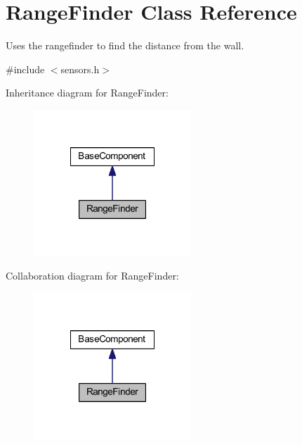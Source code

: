 \hypertarget{class_range_finder}{\section{\-Range\-Finder \-Class \-Reference}
\label{class_range_finder}
}


\-Uses the rangefinder to find the distance from the wall.  




{\ttfamily \#include $<$sensors.\-h$>$}



\-Inheritance diagram for \-Range\-Finder\-:\nopagebreak
\begin{figure}[H]
\begin{center}
\leavevmode
\includegraphics[width=168pt]{class_range_finder__inherit__graph}
\end{center}
\end{figure}


\-Collaboration diagram for \-Range\-Finder\-:\nopagebreak
\begin{figure}[H]
\begin{center}
\leavevmode
\includegraphics[width=168pt]{class_range_finder__coll__graph}
\end{center}
\end{figure}

